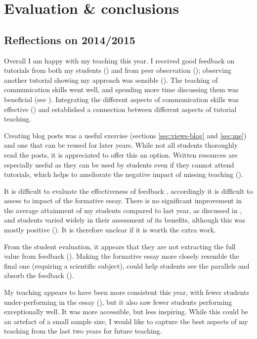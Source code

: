 \chapter{Evaluation \& conclusions}\label{ch:conc}

\section{Reflections on 2014/2015}

Overall I am happy with my teaching this year. I received good feedback on tutorials from both my students () and from peer observation (); observing another tutorial showing my approach was sensible (). The teaching of communication skills went well, and spending more time discussing them was beneficial (see ). Integrating the different aspects of communication skills was effective () and established a connection between different aspects of tutorial teaching.

Creating blog posts was a useful exercise (sections \ref{sec:views-blog} and \ref{sec:me}) and one that can be reused for later years. While not all students thoroughly read the posts, it is appreciated to offer this an option. Written resources are especially useful as they can be used by students even if they cannot attend tutorials, which helps to ameliorate the negative impact of missing teaching ().

It is difficult to evaluate the effectiveness of feedback \citep{Price2010}, accordingly it is difficult to assess to impact of the formative essay. There is no significant improvement in the average attainment of my students compared to last year, as discussed in , and students varied widely in their assessment of its benefits, although this was mostly positive (). It is therefore unclear if it is worth the extra work.

From the student evaluation, it appears that they are not extracting the full value from feedback (). Making the formative essay more closely resemble the final one (requiring a scientific subject), could help students see the parallels and absorb the feedback ().

My teaching appears to have been more consistent this year, with fewer students under-performing in the essay (), but it also saw fewer students performing exceptionally well. It was more accessible, but less inspiring. While this could be an artefact of a small sample size, I would like to capture the best aspects of my teaching from the last two years for future teaching.

